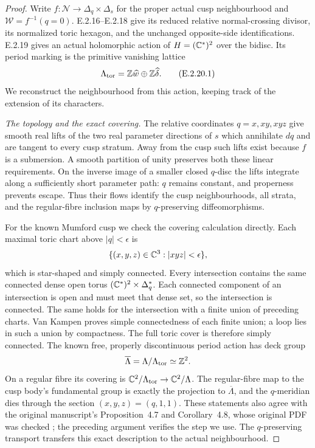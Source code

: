 \begin{proof}
Write $f:\mathcal N\to\Delta_q\times\Delta_s$
for the proper actual cusp neighbourhood and
$\mathcal W=f^{-1}(q=0)$.  E.2.16--E.2.18
give its reduced relative normal-crossing
divisor, its normalized toric hexagon, and
the unchanged opposite-side identifications.
E.2.19 gives an actual holomorphic action
of $H=(\mathbb C^*)^2$ over the bidisc.  Its
period marking is the primitive vanishing
lattice
\[
 \Lambda_{\rm tor}
   =\mathbb Z\widehat w\oplus\mathbb Z\widehat\delta.
 \tag{E.2.20.1}
\]
We reconstruct the neighbourhood from
this action, keeping track of the
extension of its characters.

\emph{The topology and the exact covering.}
The relative coordinates
$q=x,xy,xyz$ give smooth real lifts
of the two real parameter directions
of $s$ which annihilate $dq$ and
are tangent to every cusp stratum.
Away from the cusp such lifts exist
because $f$ is a submersion.
A smooth partition of unity preserves
both these linear requirements.
On the inverse image of a smaller
closed $q$-disc the lifts integrate
along a sufficiently short parameter
path: $q$ remains constant, and
properness prevents escape.
Thus their flows identify the cusp
neighbourhoods, all strata, and
the regular-fibre inclusion maps
by $q$-preserving diffeomorphisms.

For the known Mumford cusp we
check the covering calculation
directly.  Each maximal toric
chart above $|q|<\epsilon$ is
\[
 \{(x,y,z)\in\mathbb C^3:|xyz|<\epsilon\},
\]
which is star-shaped and simply
connected.  Every intersection
contains the same connected dense
open torus $(\mathbb C^*)^2\times\Delta_q^*$.
Each connected component of an
intersection is open and must meet
that dense set, so the intersection
is connected.  The same holds for
the intersection with a finite
union of preceding charts.
Van Kampen proves simple
connectedness of each finite
union; a loop lies in such a
union by compactness.  The full
toric cover is therefore simply
connected.  The known free,
properly discontinuous period
action has deck group
\[
 \overline\Lambda=\Lambda/\Lambda_{\rm tor}
                 \simeq\mathbb Z^2.
\]
On a regular fibre its covering
is $\mathbb C^2/\Lambda_{\rm tor}\to
\mathbb C^2/\Lambda$.  The regular-fibre
map to the cusp body's fundamental
group is exactly the projection
to $\overline\Lambda$, and the
$q$-meridian dies through the
section $(x,y,z)=(q,1,1)$.
These statements also agree
with the original manuscript's
Proposition~4.7 and Corollary~4.8,
whose original PDF was checked
\cite[p.~30]{AC26Root}; the
preceding argument verifies
the step we use.  The
$q$-preserving transport transfers
this exact description to the
actual neighbourhood.


\end{proof}
